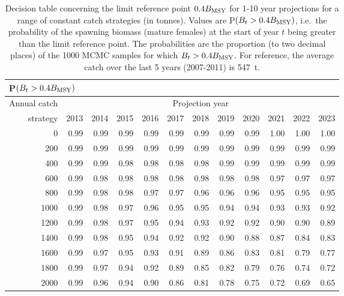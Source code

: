 \begin{table}[tbp]
\begin{center}
\caption{Decision table concerning the limit reference point $0.4 B_\mathrm{MSY}$ for 1-10 year projections for a range of constant catch strategies (in tonnes). Values are P$(B_t > 0.4 B_\mathrm{MSY})$, i.e.~the probability of the spawning biomass (mature females) at the start of year $t$ being greater than the limit reference point. The probabilities are the proportion (to two decimal places) of the 1000 MCMC samples for which $B_t > 0.4 B_\mathrm{MSY}$. For reference, the average catch over the last 5 years (2007-2011) is 547~t.}
\label{tab:LRP10}
\begin{tabular}{rrrrrrrrrrrr}
\multicolumn{12}{l}{P$(B_t > 0.4 B_\mathrm{MSY})$} \\
\hline
Annual catch & \multicolumn{11}{c}{Projection year} \\
\cline{2-12}
strategy & 2013 & 2014 & 2015 & 2016 & 2017 & 2018 & 2019 & 2020 & 2021 & 2022 & 2023 \\ 
  \hline
0 & 0.99 & 0.99 & 0.99 & 0.99 & 0.99 & 0.99 & 0.99 & 0.99 & 1.00 & 1.00 & 1.00 \\ 
  200 & 0.99 & 0.99 & 0.99 & 0.99 & 0.99 & 0.99 & 0.99 & 0.99 & 0.99 & 0.99 & 0.99 \\ 
  400 & 0.99 & 0.99 & 0.98 & 0.98 & 0.98 & 0.98 & 0.99 & 0.99 & 0.99 & 0.99 & 0.99 \\ 
  600 & 0.99 & 0.98 & 0.98 & 0.98 & 0.98 & 0.98 & 0.98 & 0.98 & 0.97 & 0.97 & 0.97 \\ 
  800 & 0.99 & 0.98 & 0.98 & 0.97 & 0.97 & 0.96 & 0.96 & 0.96 & 0.95 & 0.95 & 0.95 \\ 
  1000 & 0.99 & 0.98 & 0.97 & 0.96 & 0.95 & 0.95 & 0.94 & 0.94 & 0.93 & 0.93 & 0.92 \\ 
  1200 & 0.99 & 0.98 & 0.97 & 0.95 & 0.94 & 0.93 & 0.92 & 0.92 & 0.90 & 0.90 & 0.89 \\ 
  1400 & 0.99 & 0.98 & 0.95 & 0.94 & 0.92 & 0.92 & 0.90 & 0.88 & 0.87 & 0.84 & 0.83 \\ 
  1600 & 0.99 & 0.97 & 0.95 & 0.93 & 0.91 & 0.89 & 0.86 & 0.83 & 0.81 & 0.79 & 0.77 \\ 
  1800 & 0.99 & 0.97 & 0.94 & 0.92 & 0.89 & 0.85 & 0.82 & 0.79 & 0.76 & 0.74 & 0.72 \\ 
  2000 & 0.99 & 0.96 & 0.94 & 0.90 & 0.86 & 0.81 & 0.78 & 0.75 & 0.72 & 0.69 & 0.65 \\ 
   \hline
\end{tabular}
\end{center}
\end{table}%
